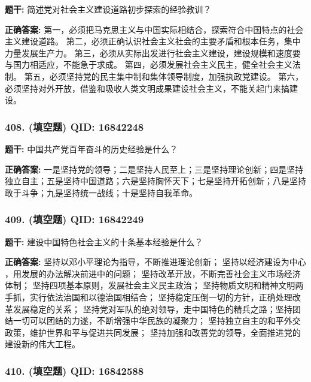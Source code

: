 \documentclass[12pt,UTF8]{ctexart}
\begin{document}
\textbf{题干:}
简述党对社会主义建设道路初步探索的经验教训？

\textbf{正确答案:}
第一，必须把马克思主义与中国实际相结合，探索符合中国特点的社会主义建设道路。
第二，必须正确认识社会主义社会的主要矛盾和根本任务，集中力量发展生产力。
第三，必须从实际出发进行社会主义建设，建设规模和速度要与国力相适应，不能急于求成。
第四，必须发展社会主义民主，健全社会主义法制。
第五，必须坚持党的民主集中制和集体领导制度，加强执政党建设。
第六，必须坚持对外开放，借鉴和吸收人类文明成果建设社会主义，不能关起门来搞建设。

\vspace{0.3em}\hrulefill\vspace{0.7em}

\subsubsection*{408. (填空题) \small QID: 16842248}

\textbf{题干:}
中国共产党百年奋斗的历史经验是什么？

\textbf{正确答案:}
一是坚持党的领导；二是坚持人民至上；三是坚持理论创新；四是坚持独立自主；五是坚持中国道路；六是坚持胸怀天下；七是坚持开拓创新；八是坚持敢于斗争；九是坚持统一战线；十是坚持自我革命。

\vspace{0.3em}\hrulefill\vspace{0.7em}

\subsubsection*{409. (填空题) \small QID: 16842249}

\textbf{题干:}
建设中国特色社会主义的十条基本经验是什么？

\textbf{正确答案:}
坚持以邓小平理论为指导，不断推进理论创新；
坚持以经济建设为中心 ，用发展的办法解决前进中的问题；
坚持改革开放，不断完善社会主义市场经济体制；
坚持四项基本原则，发展社会主义民主政治；
坚持物质文明和精神文明两手抓，实行依法治国和以德治国相结合；
坚持稳定压倒一切的方针，正确处理改革发展稳定的关系；
坚持党对军队的绝对领导，走中国特色的精兵之路；坚持团结一切可以团结的力遂，不断增强中华民族的凝聚力；
坚持独立自主的和平外交政策，维护世界和平与促进共同发展；
坚持加强和改善党的领导，全面推进党的建设新的伟大工程。

\vspace{0.3em}\hrulefill\vspace{0.7em}

\subsubsection*{410. (填空题) \small QID: 16842588}
\end{document}
